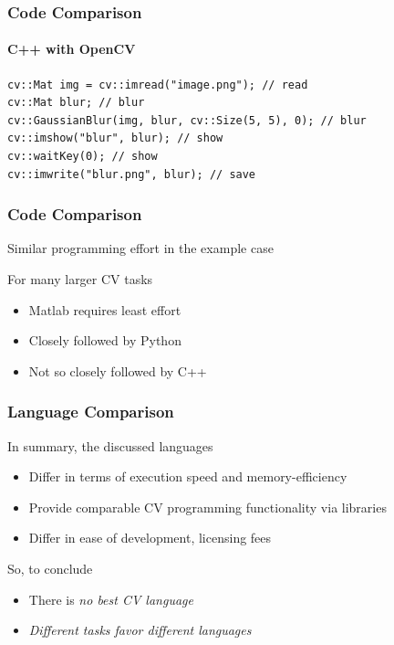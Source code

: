 \documentclass[xetex,professionalfont]{beamer}
\begin{document}

\begin{frame}[fragile]
\frametitle{Code Comparison}
\framesubtitle{C++ with OpenCV}

\begin{verbatim}
cv::Mat img = cv::imread("image.png"); // read
cv::Mat blur; // blur
cv::GaussianBlur(img, blur, cv::Size(5, 5), 0); // blur
cv::imshow("blur", blur); // show
cv::waitKey(0); // show
cv::imwrite("blur.png", blur); // save
\end{verbatim}

\end{frame}


\begin{frame}
\frametitle{Code Comparison}

Similar programming effort in the example case

\bigskip
For many larger CV tasks
\begin{itemize}
	\item Matlab requires least effort
	\item Closely followed by Python
	\item Not so closely followed by C++
\end{itemize}

\end{frame}


\begin{frame}
\frametitle{Language Comparison}

In summary, the discussed languages
\begin{itemize}
	\item Differ in terms of execution speed and memory-efficiency
	\item Provide comparable CV programming functionality via libraries
	\item Differ in ease of development, licensing fees
\end{itemize}

\bigskip
So, to conclude
\begin{itemize}
	\item There is \emph{no best CV language}
	\item \emph{Different tasks favor different languages}
\end{itemize}

\end{frame}
\end{document}

